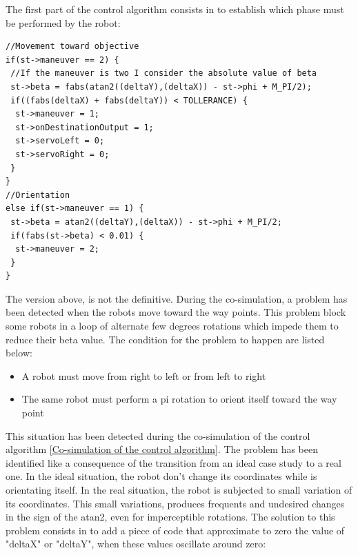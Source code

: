 \documentclass[english]{article}
\begin{document}
The first part of the control algorithm consists in to establish which phase must be performed by the robot:

\begin{lstlisting}
//Movement toward objective
if(st->maneuver == 2) {
 //If the maneuver is two I consider the absolute value of beta
 st->beta = fabs(atan2((deltaY),(deltaX)) - st->phi + M_PI/2);
 if((fabs(deltaX) + fabs(deltaY)) < TOLLERANCE) {
  st->maneuver = 1;
  st->onDestinationOutput = 1;
  st->servoLeft = 0;
  st->servoRight = 0;
 }
}
//Orientation 
else if(st->maneuver == 1) {
 st->beta = atan2((deltaY),(deltaX)) - st->phi + M_PI/2;
 if(fabs(st->beta) < 0.01) {
  st->maneuver = 2;
 }
}
\end{lstlisting}

\noindent The version above, is not the definitive. During the co-simulation, a problem has been detected when the robots move toward the way points. This problem block some robots in a loop of alternate few degrees rotations which impede them to reduce their beta value. The condition for the problem to happen are listed below:

\begin{itemize}
	\item A robot must move from right to left or from left to right
	\item The same robot must perform a pi rotation to orient itself toward the way point
\end{itemize}

\noindent This situation has been detected during the co-simulation of the control algorithm \ref{Co-simulation of the control algorithm}. The problem has been identified like a consequence of the transition from an ideal case study to a real one. In the ideal situation, the robot don't change its coordinates while is orientating itself. In the real situation, the robot is subjected to small variation of its coordinates. This small variations, produces frequents and undesired changes in the sign of the atan2, even for  imperceptible rotations. The solution to this problem consists in to add a piece of code that approximate to zero the value of "deltaX" or "deltaY", when these values oscillate around zero:
\end{document}
